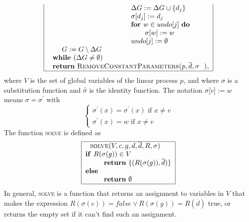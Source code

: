 \documentclass{article}
\begin{document}
\[\begin{tabular}{|l|}
$\qquad \qquad \qquad \qquad \qquad \qquad \Delta G:=\Delta G\cup \{d_{j}\}$
\\ 
$\qquad \qquad \qquad \qquad \qquad \qquad \sigma \lbrack d_{j}]:=d_{j}$ \\ 
$\qquad \qquad \qquad \qquad \qquad \qquad $\textbf{for }$w\in undo[j]$ 
\textbf{do} \\ 
$\qquad \qquad \qquad \qquad \qquad \qquad \qquad \sigma \lbrack w]:=w$ \\ 
$\qquad \qquad \qquad \qquad \qquad \qquad undo[j]:=\emptyset $ \\ 
$\qquad G:=G\setminus \Delta G$ \\ 
$\text{\textbf{while }}(\Delta G\neq \emptyset )$ \\ 
$\text{\textbf{return} \textsc{RemoveConstantParameters(}}p,\overline{d}%
,\sigma \text{\textsc{)}},$ \\ \hline
\end{tabular}%
\]%
where $V$ is the set of global variables of the linear process $p$, and
where $\sigma $ is a substitution function and $\widehat{\sigma }$ is the
identity function. The notation $\sigma \lbrack v]:=w$ means $\sigma =\sigma
^{\prime }$ with%
\[
\left\{ 
\begin{array}{l}
\sigma ^{\prime }(x)=\sigma ^{\prime }(x)\text{ if }x\neq v \\ 
\sigma ^{\prime }(x)=w\text{ if }x\neq v%
\end{array}%
\right. 
\]%
The function \textsc{solve} is defined as%
\[
\begin{tabular}{|l|}
\hline
$\text{\textsc{solve}}(V,c,g,d,\overline{d},R,\sigma )$ \\ 
\textbf{if }$R(\sigma (g))\in V$ \\ 
$\qquad \text{\textbf{return} }\{(R(\sigma (g)),\overline{d})\}$ \\ 
\textbf{else} \\ 
$\qquad \text{\textbf{return} }\emptyset $ \\ \hline
\end{tabular}%
\]%
In general, \textsc{solve} is a function that returns an assignment to
variables in $V$ that makes the expression $R(\sigma (c))=false\vee R(\sigma
(g))=R(\overline{d})$ true, or returns the empty set if it can't find such
an assignment.
\end{document}
